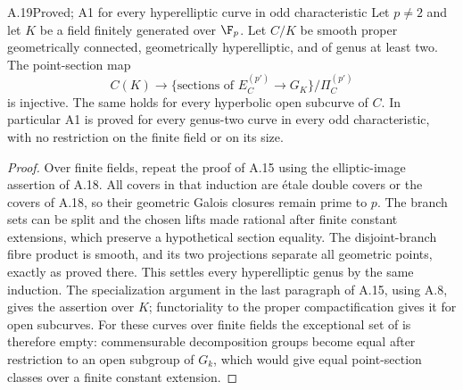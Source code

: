 \begin{claim}{A.19}{Proved; A1 for every hyperelliptic curve in odd characteristic}
Let $p\ne2$ and let $K$ be a field finitely generated over
$\F_p$. Let $C/K$ be smooth proper geometrically connected,
geometrically hyperelliptic, and of genus at least two.
The point-section map
\[
 C(K)\longrightarrow
 \{\text{sections of }E_C^{(p')}\to G_K\}/\Pi_C^{(p')}
\]
is injective. The same holds for every hyperbolic open
subcurve of $C$. In particular A1 is proved for every
genus-two curve in every odd characteristic, with no
restriction on the finite field or on its size.
\end{claim}
\begin{proof}
Over finite fields, repeat the proof of A.15 using the
elliptic-image assertion of A.18. All covers in that
induction are \'etale double covers or the covers of A.18,
so their geometric Galois closures remain prime to $p$.
The branch sets can be split and the chosen lifts made
rational after finite constant extensions, which preserve
a hypothetical section equality. The disjoint-branch
fibre product is smooth, and its two projections separate
all geometric points, exactly as proved there. This
settles every hyperelliptic genus by the same induction.
The specialization argument in the last paragraph of
A.15, using A.8, gives the assertion over $K$; functoriality
to the proper compactification gives it for open subcurves.
For these curves over finite fields the exceptional set of
\citet[Proposition 1.8]{A_SaidiTamagawa2009} is therefore empty:
commensurable decomposition groups become equal after
restriction to an open subgroup of $G_k$, which would give
equal point-section classes over a finite constant extension.
\end{proof}

